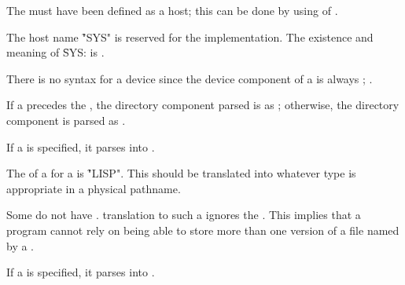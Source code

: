 The  must have been defined as a  host;
this can be done by using  of .

The  host name \f{"SYS"} is reserved for the implementation.
The existence and meaning of \f{SYS:}  
is .
 
\endsubsubsubsection%

 
There is no syntax for a  device since
the device component of a  is always ;
\seesection\LogicalPathCompUnspecific.

\endsubsubsubsection%


If a  precedes the ,
the directory component parsed is as ;
otherwise, the directory component is parsed as .

If a  is specified,
it parses into .
 
\endsubsubsubsection%


The  of a  for a 
is \f{"LISP"}.   This should be translated into whatever type is 
appropriate in a physical pathname.
 
\endsubsubsubsection%


Some  do not have . 
 translation to such a 
ignores the .
This implies that a program cannot rely on being able to store
more than one version of a file named by a .

If a  is specified,
it parses into .

\endsubsubsubsection%

